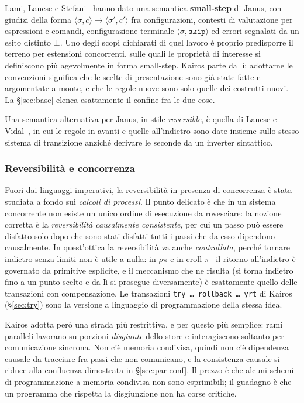 Lami, Lanese e Stefani~\cite{LamiLaneseStefani2024} hanno dato una semantica
\textbf{small-step} di Janus, con giudizi della forma $\langle \sigma, c\rangle
\to \langle \sigma', c'\rangle$ fra configurazioni, contesti di valutazione per
espressioni e comandi, configurazione terminale $\langle \sigma,
\mathtt{skip}\rangle$ ed errori segnalati da un esito distinto $\bot$. Uno degli
scopi dichiarati di quel lavoro è proprio predisporre il terreno per estensioni
concorrenti, sulle quali le proprietà di interesse si definiscono più
agevolmente in forma small-step. Kairos parte da lì: adottarne le convenzioni
significa che le scelte di presentazione sono già state fatte e argomentate a
monte, e che le regole nuove sono solo quelle dei costrutti nuovi. La
\S\ref{sec:base} elenca esattamente il confine fra le due cose.

Una semantica alternativa per Janus, in stile \emph{reversible}, è quella di
Lanese e Vidal~\cite{LaneseVidal2026}, in cui le regole in avanti e quelle
all'indietro sono date insieme sullo stesso sistema di transizione anziché
derivare le seconde da un inverter sintattico.

\subsubsection{Reversibilità e concorrenza}

Fuori dai linguaggi imperativi, la reversibilità in presenza di concorrenza è
stata studiata a fondo sui \emph{calcoli di processi}. Il punto delicato è che
in un sistema concorrente non esiste un unico ordine di esecuzione da
rovesciare: la nozione corretta è la \emph{reversibilità causalmente
consistente}, per cui un passo può essere disfatto solo dopo che sono stati
disfatti tutti i passi che da esso dipendono causalmente. In quest'ottica la
reversibilità va anche \emph{controllata}, perché tornare indietro senza limiti
non è utile a nulla: in $\rho\pi$ e in
croll-$\pi$~\cite{LaneseMezzinaSchmittStefani2011,%
LaneseLienhardtMezzinaSchmittStefani2013} il ritorno all'indietro è governato da
primitive esplicite, e il meccanismo che ne risulta (si torna indietro fino a
un punto scelto e da lì si prosegue diversamente) è esattamente quello delle
transazioni con compensazione. Le transazioni
\texttt{try\,\dots\,rollback\,\dots\,yrt} di Kairos (\S\ref{sec:try}) sono la
versione a linguaggio di programmazione della stessa idea.

Kairos adotta però una strada più restrittiva, e per questo più semplice: rami
paralleli lavorano su porzioni \emph{disgiunte} dello store e interagiscono
soltanto per comunicazione sincrona. Non c'è memoria condivisa, quindi non c'è
dipendenza causale da tracciare fra passi che non comunicano, e la consistenza
causale si riduce alla confluenza dimostrata in \S\ref{sec:par-conf}. Il prezzo
è che alcuni schemi di programmazione a memoria condivisa non sono esprimibili;
il guadagno è che un programma che rispetta la disgiunzione non ha corse
critiche.

